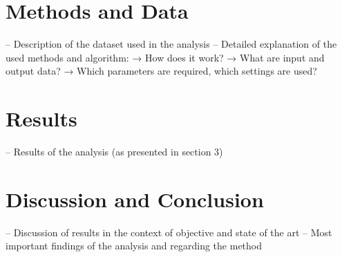 \documentclass{isprs} %
\begin{document}
\section{Methods and Data}
– Description of the dataset used in the analysis
– Detailed explanation of the used methods and algorithm: 
→ How does it work?
 → What are input and output data?
 → Which parameters are required, which settings are used?

















\section{Results}
– Results of the analysis (as presented in section 3)




































\section{Discussion and Conclusion}
– Discussion of results in the context of objective and state of the art
– Most important findings of the analysis and regarding the method
\end{document}
